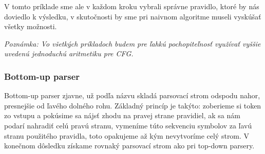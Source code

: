 \documentclass[12pt,a4paper]{report}
\theoremstyle{definition}
\theoremstyle{remark}
\newcommand\tab[1][1cm]{\hspace*{#1}}
\begin{document}
%


V tomto príklade sme ale v každom kroku vybrali správne pravidlo, ktoré by nás doviedlo k výsledku, v skutočnosti by sme pri naivnom algoritme museli vyskúšať všetky možnosti.


\textit{Poznámka: Vo všetkých príkladoch budem pre ľahkú pochopiteľnosť využívať vyššie uvedenú jednoduchú aritmetiku pre CFG.} 
\subsubsection*{Bottom-up parser} 

Bottom-up parser zjavne, už podľa názvu skladá parsovací strom odspodu nahor, presnejšie od ľavého dolného rohu. Základný princíp je takýto: zoberieme si token zo vstupu a pokúsime sa nájsť zhodu na pravej strane pravidiel, ak sa nám podarí nahradiť celú pravú stranu, vymeníme túto sekvenciu symbolov za ľavú stranu použitého pravidla, toto opakujeme až kým nevytvoríme celý strom. V konečnom dôsledku získame rovnaký parsovací strom ako pri top-down parsery.
\end{document}
